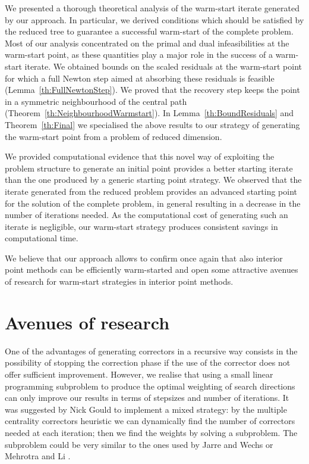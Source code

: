 We presented a thorough theoretical analysis of the warm-start
iterate generated by our approach.
In particular, we derived conditions 
which should be satisfied by the reduced tree to guarantee a successful 
warm-start of the complete problem. 
Most of our analysis concentrated on the primal and dual infeasibilities
at the warm-start point, as these quantities play a major role in the
success of a warm-start iterate.
We obtained bounds on the scaled residuals at the warm-start point
for which a full Newton step aimed at absorbing these residuals
is feasible (Lemma~\ref{th:FullNewtonStep}).
We proved that the recovery step keeps the point in a
symmetric neighbourhood of the central path
(Theorem~\ref{th:NeighbourhoodWarmstart}).
In Lemma~\ref{th:BoundResiduals} and Theorem~\ref{th:Final} we specialised
the above results to our strategy of generating the warm-start
point from a problem of reduced dimension.

We provided computational evidence that this novel way 
of exploiting the problem structure to generate an initial point 
provides a better starting iterate than the one produced by a generic 
starting point strategy.
We observed that the iterate generated from the reduced problem
provides an advanced starting point for the solution of the complete problem,
in general resulting in a decrease in the number of iterations needed.
As the computational cost of generating such an iterate is negligible,
our warm-start strategy produces consistent savings in computational time.

We believe that our approach allows to confirm once again 
that also interior point methods can
be efficiently warm-started and open some attractive avenues of 
research for warm-start strategies in interior point methods.


%
%
\section{Avenues of research}

One of the advantages of generating correctors in a recursive way
consists in the possibility of stopping the correction phase
if the use of the corrector does not offer sufficient improvement.
However, we realise that using a small linear programming subproblem
to produce the optimal weighting of search directions can only improve
our results in terms of stepsizes and number of iterations.
It was suggested by Nick Gould to implement a mixed strategy:
by the multiple centrality correctors heuristic we can dynamically
find the number of correctors needed at each iteration; then we find
the weights by solving a subproblem.
The subproblem could be very similar to the ones used by
Jarre and Wechs \cite{JarreWechs} or Mehrotra and Li \cite{MehrotraLi}.

